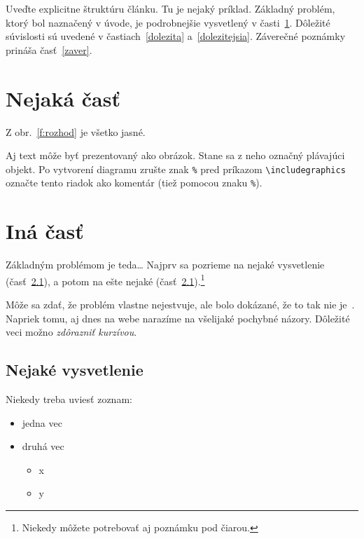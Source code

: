 \documentclass[10pt,twoside,slovak,a4paper]{coursepaper}
\begin{document}
Uveďte explicitne štruktúru článku. Tu je nejaký príklad.
Základný problém, ktorý bol naznačený v úvode, je podrobnejšie vysvetlený v časti~\ref{nejaka}.
Dôležité súvislosti sú uvedené v častiach~\ref{dolezita} a~\ref{dolezitejsia}.
Záverečné poznámky prináša časť~\ref{zaver}.



\section{Nejaká časť} \label{nejaka}

Z obr.~\ref{f:rozhod} je všetko jasné. 

\begin{figure*}[tbh]
\centering
Aj text môže byť prezentovaný ako obrázok. Stane sa z neho označný plávajúci objekt. Po vytvorení diagramu zrušte znak \texttt{\%} pred príkazom \verb|\includegraphics| označte tento riadok ako komentár (tiež pomocou znaku \texttt{\%}).
\caption{Rozhodujúci argument.}
\label{f:rozhod}
\end{figure*}



\section{Iná časť} \label{ina}

Základným problémom je teda\ldots{} Najprv sa pozrieme na nejaké vysvetlenie (časť~\ref{ina:nejake}), a potom na ešte nejaké (časť~\ref{ina:nejake}).\footnote{Niekedy môžete potrebovať aj poznámku pod čiarou.}

Môže sa zdať, že problém vlastne nejestvuje\cite{Coplien:MPD}, ale bolo dokázané, že to tak nie je~\cite{Czarnecki:Staged, Czarnecki:Progress}. Napriek tomu, aj dnes na webe narazíme na všelijaké pochybné názory\cite{PLP-Framework}. Dôležité veci možno \emph{zdôrazniť kurzívou}.


\subsection{Nejaké vysvetlenie} \label{ina:nejake}

Niekedy treba uviesť zoznam:

\begin{itemize}
\item jedna vec
\item druhá vec
	\begin{itemize}
	\item x
	\item y
	\end{itemize}
\end{itemize}
\end{document}
